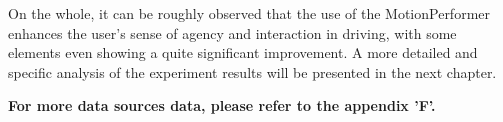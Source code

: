 On the whole, it can be roughly observed that the use of the MotionPerformer enhances the user's sense of agency and interaction in driving, with some elements even showing a quite significant improvement. A more detailed and specific analysis of the experiment results will be presented in the next chapter.

\textbf{For more data sources data, please refer to the appendix 'F'.}




